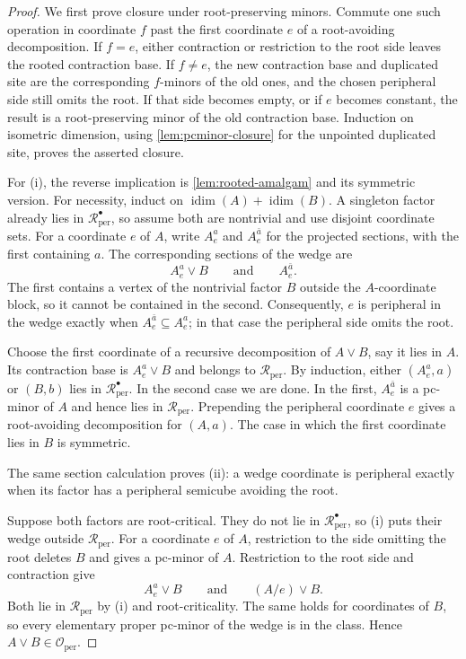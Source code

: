 \documentclass[11pt]{article}
\theoremstyle{definition}
\theoremstyle{remark}
\newcommand{\Rper}{\mathcal R_{\mathrm{per}}}
\newcommand{\Rbullet}{\mathcal R_{\mathrm{per}}^{\bullet}}
\newcommand{\Oper}{\mathcal O_{\mathrm{per}}}
\newcommand{\idim}{\operatorname{idim}}
\begin{document}
\begin{proof}
We first prove closure under root-preserving minors.  Commute one such
operation in coordinate \(f\) past the first coordinate \(e\) of a
root-avoiding decomposition.  If \(f=e\), either contraction or restriction
to the root side leaves the rooted contraction base.  If \(f\ne e\), the
new contraction base and duplicated site are the corresponding \(f\)-minors
of the old ones, and the chosen peripheral side still omits the root.  If
that side becomes empty, or if \(e\) becomes constant, the result is a
root-preserving minor of the old contraction base.  Induction on isometric
dimension, using \cref{lem:pcminor-closure} for the unpointed duplicated
site, proves the asserted closure.

For (i), the reverse implication is \cref{lem:rooted-amalgam} and its
symmetric version.  For necessity, induct on
\(\idim(A)+\idim(B)\).  A singleton factor already lies in \(\Rbullet\), so
assume both are nontrivial and use disjoint coordinate sets.  For a
coordinate \(e\) of \(A\), write \(A_e^a\) and \(A_e^{\bar a}\) for the
projected sections, with the first containing \(a\).  The corresponding
sections of the wedge are
\[
 A_e^a\vee B
 \qquad\text{and}\qquad
 A_e^{\bar a}.
\]
The first contains a vertex of the nontrivial factor \(B\) outside the
\(A\)-coordinate block, so it cannot be contained in the second.
Consequently, \(e\) is peripheral in the wedge exactly when
\(A_e^{\bar a}\subseteq A_e^a\); in that case the peripheral side omits the
root.

Choose the first coordinate of a recursive decomposition of \(A\vee B\),
say it lies in \(A\).  Its contraction base is \(A_e^a\vee B\) and belongs
to \(\Rper\).  By induction, either \((A_e^a,a)\) or \((B,b)\) lies in
\(\Rbullet\).  In the second case we are done.  In the first,
\(A_e^{\bar a}\) is a pc-minor of \(A\) and hence lies in \(\Rper\).
Prepending the peripheral coordinate \(e\) gives a root-avoiding decomposition
for \((A,a)\).  The case in which the first coordinate lies in \(B\) is
symmetric.

The same section calculation proves (ii): a wedge coordinate is peripheral
exactly when its factor has a peripheral semicube avoiding the root.

Suppose both factors are root-critical.  They do not lie in \(\Rbullet\), so
(i) puts their wedge outside \(\Rper\).  For a coordinate \(e\) of \(A\),
restriction to the side omitting the root deletes \(B\) and gives a pc-minor
of \(A\).  Restriction to the root side and contraction give
\[
 A_e^a\vee B
 \qquad\text{and}\qquad
 (A/e)\vee B.
\]
Both lie in \(\Rper\) by (i) and root-criticality.  The same holds for
coordinates of \(B\), so every elementary proper pc-minor of the wedge is
in the class.  Hence \(A\vee B\in\Oper\).


\end{proof}
\end{document}
